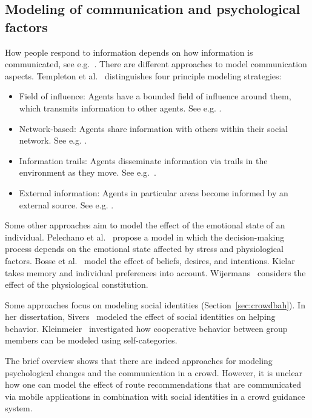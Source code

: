 \subsection{Modeling of communication and psychological factors}
How people respond to information depends on how information is communicated, see e.g.~\cite{carter-2015-life}. There are different approaches to model communication aspects. 
Templeton et al.~\cite{templeton-2023-cdyn} distinguishes four principle modeling strategies:

\begin{itemize}
\item Field of influence: Agents have a bounded field of influence around them, which transmits information to other agents. See e.g. \cite{bernardini-2014-cdyn}.
\item Network-based: Agents share information with others within their social network. See e.g. \cite{yang-2019-cdyn} .
\item Information trails: Agents disseminate information via trails in the environment as they move. See e.g.~\cite{zheng-2019-cdyn}.
\item External information: Agents in particular areas become informed by an external source. See e.g. \cite{rigos-2019-cdyn}.
\end{itemize} 

Some other approaches aim to model the effect of the emotional state of an individual. Pelechano et al.~\cite{pelechano-2005-life} propose a model in which the decision-making process depends on the emotional state affected by stress and physiological factors. Bosse et al.~\cite{bosse-2013-life} model the effect of beliefs, desires, and intentions. Kielar~\cite{kielar-2017-cdyn} takes  memory and individual preferences into account. %
Wijermans~\cite{wijermans-2011-cdyn} considers the effect of the physiological constitution.
 
Some approaches focus on modeling social identities (Section~\ref{sec:crowdbah}). In her dissertation, Sivers~\cite{sivers-2016c-cdyn} modeled the effect of social identities on helping behavior. Kleinmeier~\cite{kleinmeier-2021-cdyn} investigated how cooperative behavior between group members can be modeled using self-categories.

The brief overview shows that there are indeed approaches for modeling psychological changes and the communication in a crowd. However, it is unclear how one can model the effect of route recommendations that are communicated via mobile applications in combination with social identities in a crowd guidance system. 




